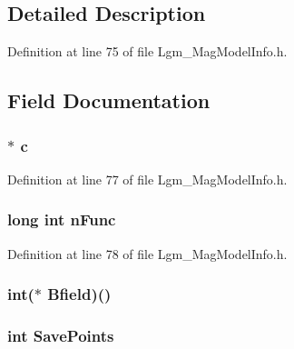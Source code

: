 \subsection{Detailed Description}


Definition at line 75 of file Lgm\_\-MagModelInfo.h.

\subsection{Field Documentation}
\hypertarget{struct_lgm___mag_model_info_db73b2e3eecb2b5b5d8a8d278fd592e7}{
\subsubsection[{c}]{$\ast$ {\bf c}}}
\label{struct_lgm___mag_model_info_db73b2e3eecb2b5b5d8a8d278fd592e7}




Definition at line 77 of file Lgm\_\-MagModelInfo.h.\hypertarget{struct_lgm___mag_model_info_86d7303c776d4ec954324d5c477c79a2}{
\subsubsection[{nFunc}]{\setlength{\rightskip}{0pt plus 5cm}long int {\bf nFunc}}}
\label{struct_lgm___mag_model_info_86d7303c776d4ec954324d5c477c79a2}




Definition at line 78 of file Lgm\_\-MagModelInfo.h.\hypertarget{struct_lgm___mag_model_info_b0506253f98bbfee0c9a097ca2bc52fe}{
\subsubsection[{Bfield}]{\setlength{\rightskip}{0pt plus 5cm}int($\ast$ {\bf Bfield})()}}
\label{struct_lgm___mag_model_info_b0506253f98bbfee0c9a097ca2bc52fe}


\hypertarget{struct_lgm___mag_model_info_947337af07b4114cc9f9706bfcb809de}{
\subsubsection[{SavePoints}]{\setlength{\rightskip}{0pt plus 5cm}int {\bf SavePoints}}}
\label{struct_lgm___mag_model_info_947337af07b4114cc9f9706bfcb809de}




